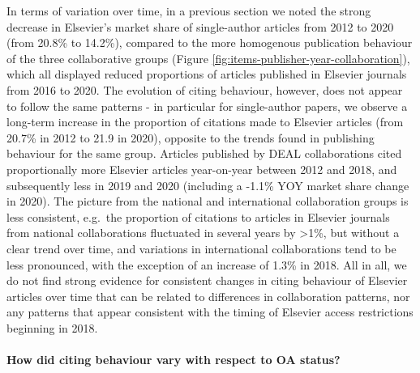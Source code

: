 \documentclass[
]{article}
\begin{document}
In terms of variation over time, in a previous section we noted the strong decrease in Elsevier's market share of single-author articles from 2012 to 2020 (from 20.8\% to 14.2\%), compared to the more homogenous publication behaviour of the three collaborative groups (Figure \ref{fig:items-publisher-year-collaboration}), which all displayed reduced proportions of articles published in Elsevier journals from 2016 to 2020. The evolution of citing behaviour, however, does not appear to follow the same patterns - in particular for single-author papers, we observe a long-term increase in the proportion of citations made to Elsevier articles (from 20.7\% in 2012 to 21.9 in 2020), opposite to the trends found in publishing behaviour for the same group. Articles published by DEAL collaborations cited proportionally more Elsevier articles year-on-year between 2012 and 2018, and subsequently less in 2019 and 2020 (including a -1.1\% YOY market share change in 2020). The picture from the national and international collaboration groups is less consistent, e.g.~the proportion of citations to articles in Elsevier journals from national collaborations fluctuated in several years by \textgreater1\%, but without a clear trend over time, and variations in international collaborations tend to be less pronounced, with the exception of an increase of 1.3\% in 2018. All in all, we do not find strong evidence for consistent changes in citing behaviour of Elsevier articles over time that can be related to differences in collaboration patterns, nor any patterns that appear consistent with the timing of Elsevier access restrictions beginning in 2018.

\hypertarget{how-did-citing-behaviour-vary-with-respect-to-oa-status}{%
\paragraph{How did citing behaviour vary with respect to OA status?}\label{how-did-citing-behaviour-vary-with-respect-to-oa-status}}
\end{document}
